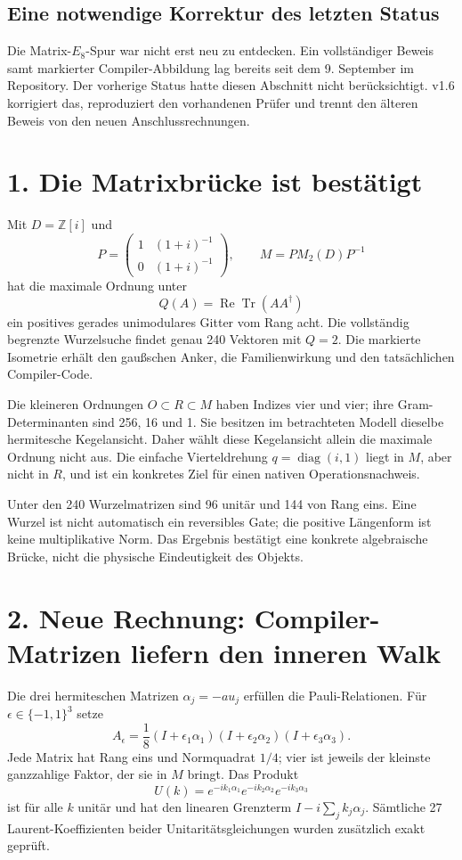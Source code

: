 \section*{Eine notwendige Korrektur des letzten Status}
Die Matrix-$E_8$-Spur war nicht erst neu zu entdecken. Ein vollständiger Beweis samt markierter Compiler-Abbildung lag bereits seit dem 9. September im Repository. Der vorherige Status hatte diesen Abschnitt nicht berücksichtigt. v1.6 korrigiert das, reproduziert den vorhandenen Prüfer und trennt den älteren Beweis von den neuen Anschlussrechnungen.

\chapter*{1. Die Matrixbrücke ist bestätigt}
Mit $D=\mathbb Z[i]$ und
\[
P=\begin{pmatrix}1&(1+i)^{-1}\\0&(1+i)^{-1}\end{pmatrix},\qquad
M=P M_2(D)P^{-1}
\]
hat die maximale Ordnung unter
\[
Q(A)=\operatorname{Re}\operatorname{Tr}(AA^\dagger)
\]
ein positives gerades unimodulares Gitter vom Rang acht. Die vollständig begrenzte Wurzelsuche findet genau 240 Vektoren mit $Q=2$. Die markierte Isometrie erhält den gaußschen Anker, die Familienwirkung und den tatsächlichen Compiler-Code.

Die kleineren Ordnungen $O\subset R\subset M$ haben Indizes vier und vier; ihre Gram-Determinanten sind 256, 16 und 1. Sie besitzen im betrachteten Modell dieselbe hermitesche Kegelansicht. Daher wählt diese Kegelansicht allein die maximale Ordnung nicht aus. Die einfache Vierteldrehung $q=\operatorname{diag}(i,1)$ liegt in $M$, aber nicht in $R$, und ist ein konkretes Ziel für einen nativen Operationsnachweis.

Unter den 240 Wurzelmatrizen sind 96 unitär und 144 von Rang eins. Eine Wurzel ist nicht automatisch ein reversibles Gate; die positive Längenform ist keine multiplikative Norm. Das Ergebnis bestätigt eine konkrete algebraische Brücke, nicht die physische Eindeutigkeit des Objekts.

\chapter*{2. Neue Rechnung: Compiler-Matrizen liefern den inneren Walk}
Die drei hermiteschen Matrizen $\alpha_j=-au_j$ erfüllen die Pauli-Relationen. Für $\epsilon\in\{-1,1\}^3$ setze
\[
A_\epsilon=\frac18(I+\epsilon_1\alpha_1)(I+\epsilon_2\alpha_2)(I+\epsilon_3\alpha_3).
\]
Jede Matrix hat Rang eins und Normquadrat $1/4$; vier ist jeweils der kleinste ganzzahlige Faktor, der sie in $M$ bringt. Das Produkt
\[
U(k)=e^{-ik_1\alpha_1}e^{-ik_2\alpha_2}e^{-ik_3\alpha_3}
\]
ist für alle $k$ unitär und hat den linearen Grenzterm $I-i\sum_jk_j\alpha_j$. Sämtliche 27 Laurent-Koeffizienten beider Unitaritätsgleichungen wurden zusätzlich exakt geprüft.

